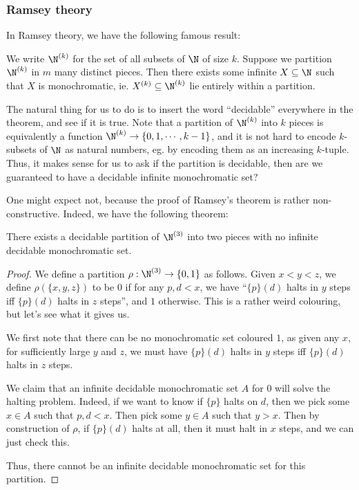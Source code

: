 \documentclass[a4paper]{article}
\begin{document}
\subsubsection*{Ramsey theory}
In Ramsey theory, we have the following famous result:
\begin{thm}
  We write $\N^{(k)}$ for the set of all subsets of $\N$ of size $k$. Suppose we partition $\N^{(k)}$ in $m$ many distinct pieces. Then there exists some infinite $X \subseteq \N$ such that $X$ is monochromatic, ie. $X^{(k)} \subseteq \N^{(k)}$ lie entirely within a partition.
\end{thm}
The natural thing for us to do is to insert the word ``decidable'' everywhere in the theorem, and see if it is true. Note that a partition of $\N^{(k)}$ into $k$ pieces is equivalently a function $\N^{(k)} \to \{0, 1, \cdots, k - 1\}$, and it is not hard to encode $k$-subsets of $\N$ as natural numbers, eg. by encoding them as an increasing $k$-tuple. Thus, it makes sense for us to ask if the partition is decidable, then are we guaranteed to have a decidable infinite monochromatic set?

One might expect not, because the proof of Ramsey's theorem is rather non-constructive. Indeed, we have the following theorem:
\begin{thm}[Jockusch]
  There exists a decidable partition of $\N^{(3)}$ into two pieces with no infinite decidable monochromatic set.
\end{thm}

\begin{proof}
  We define a partition $\rho: \N^{(3)} \to \{0, 1\}$ as follows. Given $x < y < z$, we define $\rho(\{x, y, z\})$ to be $0$ if for any $p, d < x$, we have ``$\{p\}(d)$ halts in $y$ steps iff $\{p\}(d)$ halts in $z$ steps'', and $1$ otherwise. This is a rather weird colouring, but let's see what it gives us.

  We first note that there can be no monochromatic set coloured $1$, as given any $x$, for sufficiently large $y$ and $z$, we must have $\{p\}(d)$ halts in $y$ steps iff $\{p\}(d)$ halts in $z$ steps.

  We claim that an infinite decidable monochromatic set $A$ for $0$ will solve the halting problem. Indeed, if we want to know if $\{p\}$ halts on $d$, then we pick some $x \in A$ such that $p, d < x$. Then pick some $y \in A$ such that $y > x$. Then by construction of $\rho$, if $\{p\}(d)$ halts at all, then it must halt in $x$ steps, and we can just check this.

  Thus, there cannot be an infinite decidable monochromatic set for this partition.
\end{proof}
\end{document}
